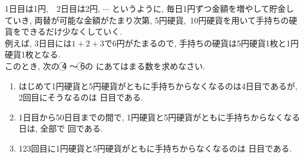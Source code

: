 \documentclass[dvipdfmx, titlepage, 11pt]{jsarticle}
\newcommand{\ncircle}[1]{\textcircled{\scriptsize #1}}
\newcommand{\nbox}[1]{\fbox{\hspace{5pt} \textcircled{\scriptsize #1}\hspace{5pt} }}
\newcommand{\ebox}{\fbox{　\hspace{10pt} }}
\begin{document}
\noindent {}\hspace{10pt} 1日目は1円,\ \ 2日目は2円, $\cdots$ というように, 毎日1円ずつ金額を増やして貯金していき, 両替が可能な金額がたまり次第, 5円硬貨,\ 10円硬貨を用いて手持ちの硬貨をできるだけ少なくしていく.\\
例えば, 3日目には$1+2+3$で6円がたまるので, 手持ちの硬貨は5円硬貨1枚と1円硬貨1枚となる.\\
このとき, 次の \ncircle{4} 〜 \ncircle{6}の \ebox にあてはまる数を求めなさい.
\begin{enumerate}[(1)]
\item はじめて1円硬貨と5円硬貨がともに手持ちからなくなるのは4日目であるが, 2回目にそうなるのは \nbox{4} 日目である.\\[3cm]
\item 1日目から50日目までの間で, 1円硬貨と5円硬貨がともに手持ちからなくなる日は, 全部で \nbox{5} 回である.\\[3cm]
\item 123回目に1円硬貨と5円硬貨がともに手持ちからなくなるのは \nbox{6} 日目である.
\end{enumerate}

\newpage
\end{document}
